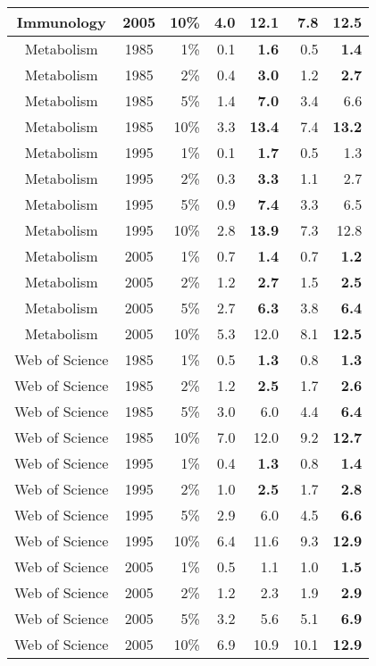 \documentclass[11pt, oneside]{article}   	%
\begin{document}
\begin{table}
\begin{centering}
{\begin{tabular}{|c crrrr r|}
Immunology & 2005&10\%& 4.0& 12.1& 7.8& \bf{12.5} \\ 
\hline
Metabolism & 1985&1\%& 0.1& \bf{1.6}& 0.5& \bf{1.4} \\ 
Metabolism & 1985&2\%& 0.4& \bf{3.0}& 1.2& \bf{2.7} \\ 
Metabolism & 1985&5\%& 1.4& \bf{7.0} & 3.4& 6.6 \\ 
Metabolism & 1985&10\%& 3.3& \bf{13.4} & 7.4& \bf{13.2} \\ 
Metabolism & 1995&1\%& 0.1& \bf{1.7} & 0.5& 1.3 \\ 
Metabolism & 1995&2\%& 0.3& \bf{3.3}& 1.1& 2.7 \\ 
Metabolism & 1995&5\%& 0.9& \bf{7.4} & 3.3& 6.5 \\ 
Metabolism & 1995&10\%& 2.8& \bf{13.9}& 7.3& 12.8 \\ 
Metabolism & 2005&1\%& 0.7& \bf{1.4}& 0.7& \bf{1.2} \\ 
Metabolism & 2005&2\%& 1.2& \bf{2.7}& 1.5& \bf{2.5} \\ 
Metabolism & 2005&5\%& 2.7& \bf{6.3} & 3.8& \bf{6.4} \\ 
Metabolism & 2005&10\%& 5.3& 12.0& 8.1& \bf{12.5} \\ 
\hline
Web of Science & 1985&1\%& 0.5& \bf{1.3}& 0.8& \bf{1.3} \\ 
Web of Science & 1985&2\%& 1.2& \bf{2.5}& 1.7& \bf{2.6} \\ 
Web of Science & 1985&5\%& 3.0& 6.0& 4.4& \bf{6.4} \\ 
Web of Science & 1985&10\%& 7.0& 12.0& 9.2& \bf{12.7} \\ 
Web of Science & 1995&1\%& 0.4& \bf{1.3}& 0.8& \bf{1.4} \\ 
Web of Science & 1995&2\%& 1.0& \bf{2.5}& 1.7& \bf{2.8} \\ 
Web of Science & 1995&5\%& 2.9& 6.0& 4.5& \bf{6.6} \\ 
Web of Science & 1995&10\%& 6.4& 11.6& 9.3& \bf{12.9} \\ 
Web of Science & 2005&1\%& 0.5& 1.1& 1.0& \bf{1.5} \\ 
Web of Science & 2005&2\%& 1.2& 2.3& 1.9& \bf{2.9} \\ 
Web of Science & 2005&5\%& 3.2& 5.6& 5.1& \bf{6.9} \\ 
Web of Science & 2005&10\%& 6.9& 10.9& 10.1& \bf{12.9} \\ 
\hline

\end{tabular}}
\end{centering}
\end{table}
\end{document}
